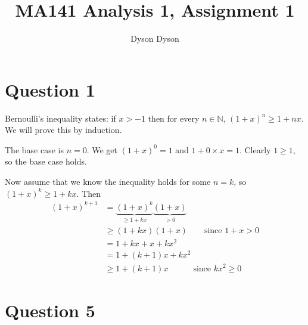 \documentclass[a4paper]{article}
\title{MA141 Analysis 1, Assignment 1}
\author{Dyson Dyson}
\date{}
\begin{document}
\maketitle

\setlength{\parindent}{0em}
\setlength{\parskip}{1em}


\section*{Question 1}

Bernoulli's inequality states: if $x > -1$ then for every $n \in \mathbb{N}$, $(1 + x)^n \ge 1 + nx$. We will prove this by induction.

The base case is $n = 0$. We get $(1 + x)^0 = 1$ and $1 + 0 \times x = 1$. Clearly $1 \ge 1$, so the base case holds.

Now assume that we know the inequality holds for some $n = k$, so $(1 + x)^k \ge 1 + kx$. Then
\begin{align*}
	(1 + x)^{k+1} &= \underbrace{(1 + x)^k}_{\ge 1 + kx} \underbrace{(1 + x)}_{> 0}\\[1ex]
				  &\ge (1 + kx) (1 + x) \qquad\text{since } 1 + x > 0 \\[1ex]
				  &= 1 + kx + x + kx^2\\[1ex]
				  &= 1 + (k+1)x + kx^2\\[1ex]
				  &\ge 1 + (k+1)x \qquad\quad\text{since }kx^2 \ge 0
\end{align*}


%
%


\section*{Question 5}
\setcounter{section}{5}
\end{document}
